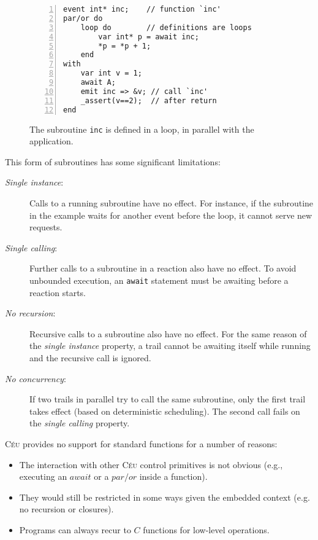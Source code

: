 \documentclass{acm_proc_article-sp}
\newcommand{\CEU}{\textsc{C\'{e}u}\xspace}
\newcommand{\code}[1] {{\small{\texttt{#1}}}}
\newcommand{\1}{\;}
\newcommand{\2}{\;\;}
\newcommand{\3}{\;\;\;}
\newcommand{\5}{\;\;\;\;\;}
\begin{document}
\begin{figure}
\begin{lstlisting}[numbers=left,xleftmargin=2em]
event int* inc;    // function `inc'
par/or do
    loop do        // definitions are loops
        var int* p = await inc;
        *p = *p + 1;
    end
with
    var int v = 1;
    await A;
    emit inc => &v; // call `inc'
    _assert(v==2);  // after return
end
\end{lstlisting}
\caption{ The subroutine \code{inc} is defined in a loop, in parallel with the 
application.
\label{lst.sub}
}
\end{figure}

This form of subroutines has some significant limitations:

\begin{description}
\item[\emph{Single instance}:] Calls to a running subroutine have no effect.
For instance, if the subroutine in the example waits for another event before 
the loop, it cannot serve new requests.
%
\item[\emph{Single calling}:] Further calls to a subroutine in a reaction also 
have no effect.
To avoid unbounded execution, an \code{await} statement must be awaiting before 
a reaction starts.
%
\item[\emph{No recursion}:] Recursive calls to a subroutine also have no 
effect.
For the same reason of the \emph{single instance} property, a trail cannot be 
awaiting itself while running and the recursive call is ignored.
%
\item[\emph{No concurrency}:] If two trails in parallel try to call the same 
subroutine, only the first trail takes effect (based on deterministic 
scheduling).
The second call fails on the \emph{single calling} property.
\end{description}

\vspace{5pt}
\CEU provides no support for standard functions for a number of reasons:
\begin{itemize}
\item The interaction with other \CEU control primitives is not obvious (e.g., 
executing an $await$ or a $par/or$ inside a function).
\item They would still be restricted in some ways given the embedded context 
(e.g.  no recursion or closures).
\item Programs can always recur to $C$ functions for low-level operations.
\end{itemize}
\end{document}

